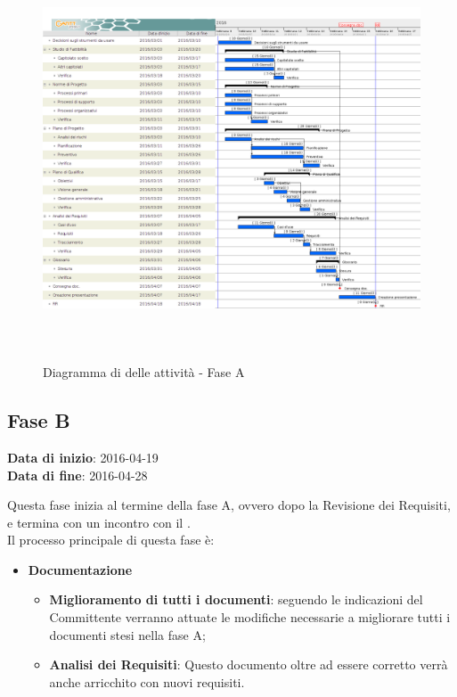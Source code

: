 		\begin{figure}[!h]
			\centering
			\includegraphics[height=12cm, width=15cm]{img/gantt/A} 
			\caption{Diagramma di  delle attività - Fase A}
		\end{figure}
		
	\subsection{Fase B}
	\begin{center}
		\textbf{Data di inizio}: 2016-04-19 \\
		\textbf{Data di fine}: 2016-04-28 \\
	\end{center}
	Questa fase inizia al termine della fase A, ovvero dopo la Revisione dei Requisiti, e termina con un incontro con il . \\ 
	Il processo principale di questa fase è:
	\begin{itemize}
		\item \textbf{Documentazione}
		\att
		\begin{itemize}
			\item \textbf{Miglioramento di tutti i documenti}: seguendo le indicazioni del Committente verranno attuate le modifiche necessarie a migliorare tutti i documenti stesi nella fase A;
			\item \textbf{Analisi dei Requisiti}: Questo documento oltre ad essere corretto verrà anche arricchito con nuovi requisiti.
		\end{itemize}
	\end{itemize}
		
